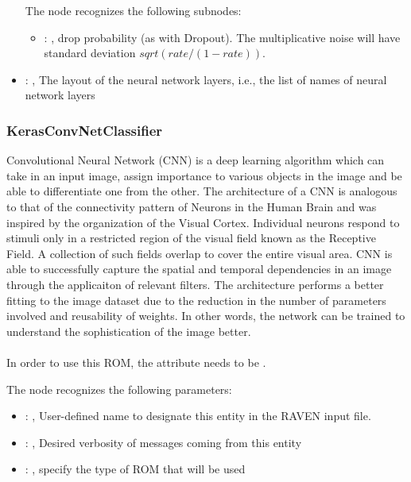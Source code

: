 \begin{itemize}
      The  node recognizes the following subnodes:
      \begin{itemize}
        \item {}: , 
          drop probability (as with Dropout). The multiplicative noise will have standard deviation
          $sqrt(rate / (1 - rate))$.
      \end{itemize}

    \item {}: , 
      The layout of the neural network layers, i.e., the list of names of neural network layers
  \end{itemize}


\subsubsection{KerasConvNetClassifier}
  Convolutional Neural Network (CNN) is a deep learning algorithm which can take in an input image,
  assign         importance to various objects in the image and be able to differentiate one from
  the other. The         architecture of a CNN is analogous to that of the connectivity pattern of
  Neurons in the Human Brain         and was inspired by the organization of the Visual Cortex.
  Individual neurons respond to stimuli only         in a restricted region of the visual field
  known as the Receptive Field. A collection of such fields         overlap to cover the entire
  visual area. CNN is able to successfully capture the spatial and temporal         dependencies in
  an image through the applicaiton of relevant filters. The architecture performs         a better
  fitting to the image dataset due to the reduction in the number of parameters involved         and
  reusability of weights. In other words, the network can be trained to understand the
  sophistication         of the image better.         \\
           \\         In order to use this ROM, the
   attribute  needs to         be .

  The  node recognizes the following parameters:
    \begin{itemize}
      \item {}: , 
        User-defined name to designate this entity in the RAVEN input file.
      \item {}: , 
        Desired verbosity of messages coming from this entity
      \item {}: , 
        specify the type of ROM that will be used
  \end{itemize}

